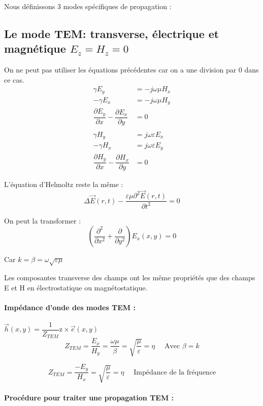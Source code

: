 \documentclass[12pt,a4paper]{report}
\begin{document}
Nous définissons 3 modes spécifiques de propagation :

\subsection{Le mode TEM: transverse, électrique et magnétique \(E_z = H_z = 0\)}

On ne peut pas utiliser les équations précédentes car on a une division par 0 dans ce cas.
\begin{align*}
	\gamma E_y &= -j\omega \mu H_x\\
	-\gamma E_x &= -j\omega \mu H_y\\
	\dfrac{\partial E_y}{\partial x} - \dfrac{\partial E_x}{\partial y} &= 0\\
	\\
	\gamma H_y &= j\omega \varepsilon E_x\\
	-\gamma H_x &= j\omega \varepsilon E_y\\
	\dfrac{\partial H_y}{\partial x} - \dfrac{\partial H_x}{\partial y} &= 0
\end{align*}

L'équation d'Helmoltz reste la même :
\[
	\Delta \vec{E}(r,t) - \dfrac{\varepsilon \mu \partial^2 \vec{E}(r,t)}{\partial t^2} = 0
\]

On peut la transformer :
\[
	\left( \dfrac{\partial^2}{\partial x^2} + \dfrac{\partial}{\partial y^2} \right) E_x(x,y) = 0
\]

Car \(k = \beta = \omega \sqrt{\varepsilon \mu}\)

Les composantes transverse des champs ont les même propriétés que des champs E et H en électrostatique ou magnétostatique.

\paragraph{Impédance d'onde des modes TEM :} \(\vec{h} (x,y) = \dfrac{1}{Z_{TEM}} \text{\^z} \times \vec{e} (x,y)\)
\[
	Z_{TEM} = \dfrac{E_x}{H_y} = \dfrac{\omega \mu}{\beta} = \sqrt{\dfrac{\mu}{\varepsilon}} = \eta \quad \text{ Avec } \beta = k
\]

\[
	Z_{TEM} = \dfrac{-E_y}{H_x} = \sqrt{\dfrac{\mu}{\varepsilon}} = \eta \quad \text{ Impédance de la fréquence}
\]

\paragraph{Procédure pour traiter une propagation TEM :} \quad
\end{document}
